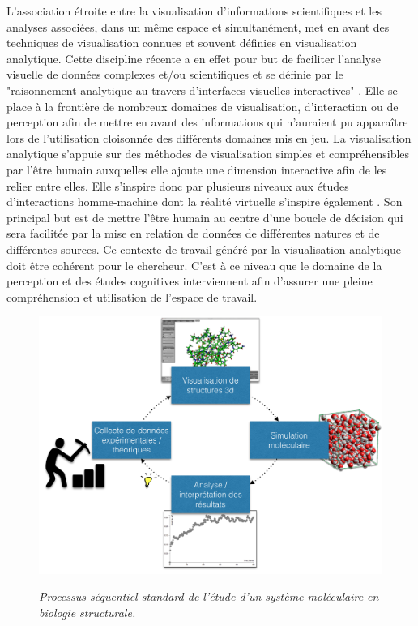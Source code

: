 L'association étroite entre la visualisation d'informations scientifiques et les analyses associées, dans un même espace et simultanément, met en avant des techniques de visualisation connues et souvent définies en visualisation analytique. Cette discipline récente a en effet pour but de faciliter l'analyse visuelle de données complexes et/ou scientifiques et se définie par le "raisonnement analytique au travers d'interfaces visuelles interactives" \cite{cook_illuminating_2005}. Elle se place à la frontière de nombreux domaines de visualisation, d'interaction ou de perception afin de mettre en avant des informations qui n'auraient pu apparaître lors de l'utilisation cloisonnée des différents domaines mis en jeu. La visualisation analytique s'appuie sur des méthodes de visualisation simples et compréhensibles par l'être humain auxquelles elle ajoute une dimension interactive afin de les relier entre elles. Elle s'inspire donc par plusieurs niveaux aux études d'interactions homme-machine dont la réalité virtuelle s'inspire également \cite{arias-hernandez_visual_2011}. Son principal but est de mettre l'être humain au centre d'une boucle de décision qui sera facilitée par la mise en relation de données de différentes natures et de différentes sources. Ce contexte de travail généré par la visualisation analytique doit être cohérent pour le chercheur. C'est à ce niveau que le domaine de la perception et des études cognitives interviennent afin d'assurer une pleine compréhension et utilisation de l'espace de travail.

\begin{figure}
  \centering
  {\includegraphics[width=.75\linewidth]{./figures/ch4/ch4_structural_biology_process}}
    \caption{{\it Processus séquentiel standard de l'étude d'un système moléculaire en biologie structurale.}}
  \label{Fig:schema_seq_bio_struct}
  \hspace{0.3cm}
\end{figure}

